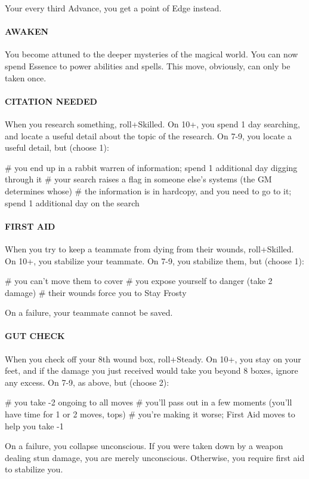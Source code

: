 Your every third Advance, you get a point of Edge instead.

\paragraph{AWAKEN}
You become attuned to the deeper mysteries of the magical world. You can now spend Essence to power abilities and spells. This move, obviously, can only be taken once.

\paragraph{CITATION NEEDED}
When you research something, roll+Skilled. On 10+, you spend 1 day searching, and locate a useful detail about the topic of the research. On 7-9, you locate a useful detail, but (choose 1):

\begin{easylist}
    # you end up in a rabbit warren of information; spend 1 additional day digging through it
    # your search raises a flag in someone else’s systems (the GM determines whose)
    # the information is in hardcopy, and you need to go to it; spend 1 additional day on the search
\end{easylist}

\paragraph{FIRST AID}
When you try to keep a teammate from dying from their wounds, roll+Skilled. On 10+, you stabilize your teammate. On 7-9, you stabilize them, but (choose 1):
\begin{easylist}
    # you can’t move them to cover
    # you expose yourself to danger (take 2 damage)
    # their wounds force you to Stay Frosty
\end{easylist}
On a failure, your teammate cannot be saved.

\paragraph{GUT CHECK}
When you check off your 8th wound box, roll+Steady. On 10+, you stay on your feet, and if the damage you just received would take you beyond 8 boxes, ignore any excess. On 7-9, as above, but (choose 2):
\begin{easylist}
    # you take -2 ongoing to all moves
    # you’ll pass out in a few moments (you’ll have time for 1 or 2 moves, tops)
    # you’re making it worse; First Aid moves to help you take -1
\end{easylist}
On a failure, you collapse unconscious. If you were taken down by a weapon dealing stun damage, you are merely unconscious. Otherwise, you require first aid to stabilize you.

